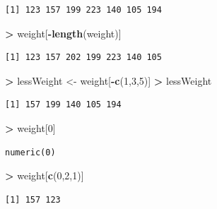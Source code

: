\documentclass[
]{krantz}
\makeatletter
\newenvironment{Shaded}{\begin{snugshade}}{\end{snugshade}}
\newcommand{\DecValTok}[1]{\textcolor[rgb]{0.06,0.06,0.06}{#1}}
\newcommand{\KeywordTok}[1]{\textcolor[rgb]{0.27,0.27,0.27}{\textbf{#1}}}
\newcommand{\NormalTok}[1]{#1}
\newcommand{\OperatorTok}[1]{\textcolor[rgb]{0.43,0.43,0.43}{\textbf{#1}}}
\newcommand{\StringTok}[1]{\textcolor[rgb]{0.5,0.5,0.5}{#1}}
\newenvironment{kframe}{%
\medskip{}
\setlength{\fboxsep}{.8em}
 \def\at@end@of@kframe{}%
 \ifinner\ifhmode%
  \def\at@end@of@kframe{\end{minipage}}%
  \begin{minipage}{\columnwidth}%
 \fi\fi%
 \def\FrameCommand##1{\hskip\@totalleftmargin \hskip-\fboxsep
 \colorbox{shadecolor}{##1}\hskip-\fboxsep
     \hskip-\linewidth \hskip-\@totalleftmargin \hskip\columnwidth}%
 \MakeFramed {\advance\hsize-\width
   \@totalleftmargin\z@ \linewidth\hsize
   \@setminipage}}%
 {\par\unskip\endMakeFramed%
 \at@end@of@kframe}
\renewenvironment{Shaded}{\begin{kframe}}{\end{kframe}}
\makeatother
\begin{document}
\begin{verbatim}
[1] 123 157 199 223 140 105 194
\end{verbatim}

\begin{Shaded}
\begin{Highlighting}[]
\OperatorTok{\textgreater{}}\StringTok{ }\NormalTok{weight[}\OperatorTok{{-}}\KeywordTok{length}\NormalTok{(weight)]}
\end{Highlighting}
\end{Shaded}

\begin{verbatim}
[1] 123 157 202 199 223 140 105
\end{verbatim}

\begin{Shaded}
\begin{Highlighting}[]
\OperatorTok{\textgreater{}}\StringTok{ }\NormalTok{lessWeight \textless{}{-}}\StringTok{ }\NormalTok{weight[}\OperatorTok{{-}}\KeywordTok{c}\NormalTok{(}\DecValTok{1}\NormalTok{,}\DecValTok{3}\NormalTok{,}\DecValTok{5}\NormalTok{)]}
\OperatorTok{\textgreater{}}\StringTok{ }\NormalTok{lessWeight}
\end{Highlighting}
\end{Shaded}

\begin{verbatim}
[1] 157 199 140 105 194
\end{verbatim}

\begin{Shaded}
\begin{Highlighting}[]
\OperatorTok{\textgreater{}}\StringTok{ }\NormalTok{weight[}\DecValTok{0}\NormalTok{]}
\end{Highlighting}
\end{Shaded}

\begin{verbatim}
numeric(0)
\end{verbatim}

\begin{Shaded}
\begin{Highlighting}[]
\OperatorTok{\textgreater{}}\StringTok{ }\NormalTok{weight[}\KeywordTok{c}\NormalTok{(}\DecValTok{0}\NormalTok{,}\DecValTok{2}\NormalTok{,}\DecValTok{1}\NormalTok{)]}
\end{Highlighting}
\end{Shaded}

\begin{verbatim}
[1] 157 123
\end{verbatim}
\end{document}
